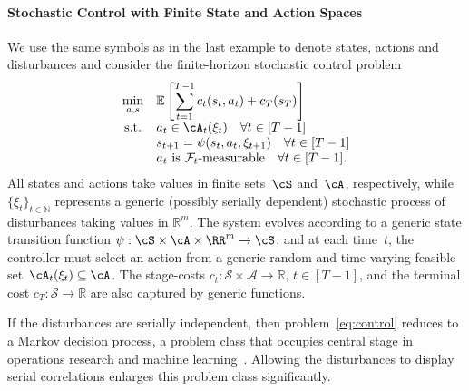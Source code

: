 \documentclass[11pt]{article}
\begin{document}
\paragraph{Stochastic Control with Finite State and Action Spaces}
We use the same symbols as in the last example to denote states, actions and disturbances and consider the finite-horizon stochastic control problem
\begin{equation}
	\label{eq:control}
	\begin{array}{cl}
	\displaystyle \min_{a,s} & \displaystyle \mathbb E\left[\sum_{t=1}^{T-1} c_t(s_t,a_t) + c_T(s_T)\right] \\
	\text{s.t.} & a_t \in \cA_t(\xi_t) \quad \forall t\in[T-1]\\
    & s_{t+1}= \psi(s_t,a_t,\xi_{t+1}) \quad\forall  t\in[T-1] \\ & a_t \text{ is $\mathcal F_t$-measurable}\quad\forall  t\in[T-1].
	\end{array}
\end{equation}
All states and actions take values in finite sets~$\cS$ and~$\cA$, respectively, while $\{\xi_t\}_{t\in \mathbb N}$ represents a generic (possibly serially dependent) stochastic process of disturbances taking values in $\mathbb{R}^m$. The system evolves according to a generic state transition function $\psi : \cS \times \cA \times \RR^m \to \cS$, and at each time~$t$, the controller must select an action from a 
generic random and time-varying feasible set~$\cA_t(\xi_t)\subseteq \cA$. The stage-costs  $c_t : \mathcal S \times \mathcal A \to \mathbb R$, $t\in[T-1]$, and the terminal cost $c_T : \mathcal S \to \mathbb R$ are also captured by generic functions. 

If the disturbances are serially independent, then problem~\eqref{eq:control} reduces to a Markov decision process, a problem class that occupies central stage in operations research and machine learning~\cite{bertsekas1995dynamic}. Allowing the disturbances to display serial correlations enlarges this problem class significantly.
\end{document}
